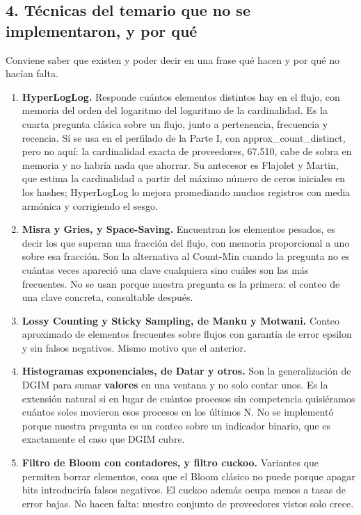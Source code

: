 \documentclass[11pt]{article}
\begin{document}
\subsection*{4. Técnicas del temario que no se implementaron, y por qué}
Conviene saber que existen y poder decir en una frase qué hacen y por qué no hacían falta.

\begin{enumerate}
  \item \textbf{HyperLogLog.} Responde cuántos elementos distintos hay en el flujo, con memoria del orden del logaritmo del logaritmo de la cardinalidad. Es la cuarta pregunta clásica sobre un flujo, junto a pertenencia, frecuencia y recencia. Sí se usa en el perfilado de la Parte I, con approx\_\allowbreak{}count\_\allowbreak{}distinct, pero no aquí: la cardinalidad exacta de proveedores, 67.510, cabe de sobra en memoria y no habría nada que ahorrar. Su antecesor es Flajolet y Martin, que estima la cardinalidad a partir del máximo número de ceros iniciales en los hashes; HyperLogLog lo mejora promediando muchos registros con media armónica y corrigiendo el sesgo.
  \item \textbf{Misra y Gries, y Space-Saving.} Encuentran los elementos pesados, es decir los que superan una fracción del flujo, con memoria proporcional a uno sobre esa fracción. Son la alternativa al Count-Min cuando la pregunta no es cuántas veces apareció una clave cualquiera sino cuáles son las más frecuentes. No se usan porque nuestra pregunta es la primera: el conteo de una clave concreta, consultable después.
  \item \textbf{Lossy Counting y Sticky Sampling, de Manku y Motwani.} Conteo aproximado de elementos frecuentes sobre flujos con garantía de error epsilon y sin falsos negativos. Mismo motivo que el anterior.
  \item \textbf{Histogramas exponenciales, de Datar y otros.} Son la generalización de DGIM para sumar \textbf{valores} en una ventana y no solo contar unos. Es la extensión natural si en lugar de cuántos procesos sin competencia quisiéramos cuántos soles movieron esos procesos en los últimos N. No se implementó porque nuestra pregunta es un conteo sobre un indicador binario, que es exactamente el caso que DGIM cubre.
  \item \textbf{Filtro de Bloom con contadores, y filtro cuckoo.} Variantes que permiten borrar elementos, cosa que el Bloom clásico no puede porque apagar bits introduciría falsos negativos. El cuckoo además ocupa menos a tasas de error bajas. No hacen falta: nuestro conjunto de proveedores vistos solo crece.

\end{enumerate}
\end{document}
